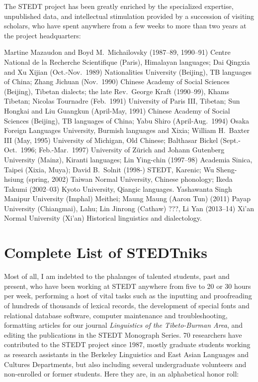 The STEDT project has been greatly enriched by the specialized expertise, unpublished data, and intellectual stimulation provided by a succession of visiting scholars, who have spent anywhere from a few weeks to more than two years at the project headquarters: 

Martine Mazaudon and Boyd M.\ Michailovsky (1987–89, 1990–91) Centre National de la Recherche Scientifique (Paris), Himalayan languages; {\sc Dai} Qingxia and {\sc Xu} Xijian (Oct.-Nov.\ 1989) Nationalities University (Beijing), TB languages of China; {\sc Zhang} Jichuan (Nov.\ 1990) Chinese Academy of Social Sciences (Beijing), Tibetan dialects; the late Rev.\ George Kraft (1990–99), Khams Tibetan; Nicolas Tournadre (Feb.\ 1991) University of Paris III, Tibetan; {\sc Sun} Hongkai and {\sc Liu} Guangkun (April-May, 1991) Chinese Academy of Social Sciences (Beijing), TB languages of China; {\sc Yabu} Shiro (April-Aug.\ 1994) Osaka Foreign Languages University, Burmish languages and Xixia; William H.\ Baxter III (May, 1995) University of Michigan, Old Chinese; Balthasar Bickel (Sept.-Oct.\ 1996; Feb.-Mar.\ 1997) University of Z\"urich and Johann Gutenberg University (Mainz), Kiranti languages; {\sc Lin} Ying-chin (1997–98) Academia Sinica, Taipei (Xixia, Muya); David B.\ Solnit (1998-) STEDT, Karenic; {\sc Wu} Sheng-hsiung (spring, 2002) Taiwan Normal University, Chinese phonology; {\sc Ikeda} Takumi (2002–03) Kyoto University, Qiangic languages. Yashawanta Singh  Manipur University (Imphal) Meithei; Maung Maung (Aaron Tun) (2011) Payap University (Chiangmai), Lahu; Lin Jinrong (Cathaw) ???, Li Yan (2013–14) Xi'an Normal University (Xi'an) Historical linguistics and dialectology.

\section{Complete List of STEDTniks}

Most of all, I am indebted to the phalanges of talented students, past and present, who have been working at STEDT anywhere from five to 20 or 30 hours per week, performing a host of vital tasks such as the inputting and proofreading of hundreds of thousands of lexical records, the development of special fonts and relational database software, computer maintenance and troubleshooting, formatting articles for our journal {\it Linguistics of the Tibeto-Burman Area}, and editing the publications in the STEDT Monograph Series. 70 researchers have contributed to the STEDT project since 1987, mostly graduate students working as research assistants in the Berkeley Linguistics and East Asian Languages and Cultures Departments, but also including several undergraduate volunteers and non-enrolled or former students. Here they are, in an alphabetical honor roll:

